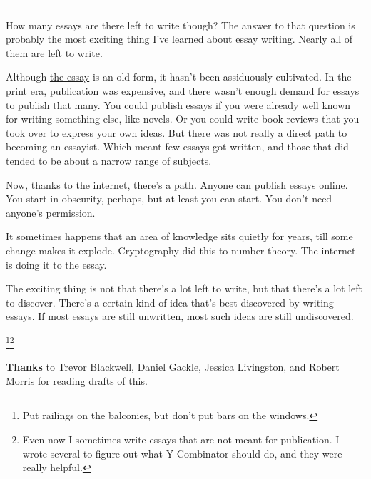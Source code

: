 \_\_\_\_\_

How many essays are there left to write though? The answer to that
question is probably the most exciting thing I've learned about essay
writing. Nearly all of them are left to write.

Although \href{essay.html}{the essay} is an old form, it hasn't been
assiduously cultivated. In the print era, publication was expensive, and
there wasn't enough demand for essays to publish that many. You could
publish essays if you were already well known for writing something
else, like novels. Or you could write book reviews that you took over to
express your own ideas. But there was not really a direct path to
becoming an essayist. Which meant few essays got written, and those that
did tended to be about a narrow range of subjects.

Now, thanks to the internet, there's a path. Anyone can publish essays
online. You start in obscurity, perhaps, but at least you can start. You
don't need anyone's permission.

It sometimes happens that an area of knowledge sits quietly for years,
till some change makes it explode. Cryptography did this to number
theory. The internet is doing it to the essay.

The exciting thing is not that there's a lot left to write, but that
there's a lot left to discover. There's a certain kind of idea that's
best discovered by writing essays. If most essays are still unwritten,
most such ideas are still undiscovered.


\footnote{Put railings on the balconies, but don't put bars on the
windows.}\footnote{Even now I sometimes write essays that are not meant for
publication. I wrote several to figure out what Y Combinator should do,
and they were really helpful.}

\textbf{Thanks} to Trevor Blackwell, Daniel Gackle, Jessica Livingston,
and Robert Morris for reading drafts of this.